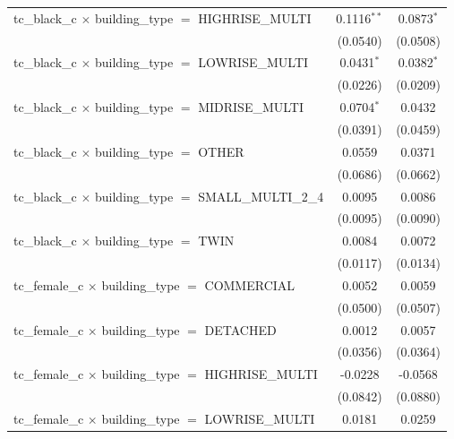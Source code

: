 \begin{tabular}{lcc}
   tc\_black\_c $\times$ building\_type $=$ HIGHRISE\_MULTI            & 0.1116$^{**}$  & 0.0873$^{*}$\\   
                                                                       & (0.0540)       & (0.0508)\\   
   tc\_black\_c $\times$ building\_type $=$ LOWRISE\_MULTI             & 0.0431$^{*}$   & 0.0382$^{*}$\\   
                                                                       & (0.0226)       & (0.0209)\\   
   tc\_black\_c $\times$ building\_type $=$ MIDRISE\_MULTI             & 0.0704$^{*}$   & 0.0432\\   
                                                                       & (0.0391)       & (0.0459)\\   
   tc\_black\_c $\times$ building\_type $=$ OTHER                      & 0.0559         & 0.0371\\   
                                                                       & (0.0686)       & (0.0662)\\   
   tc\_black\_c $\times$ building\_type $=$ SMALL\_MULTI\_2\_4         & 0.0095         & 0.0086\\   
                                                                       & (0.0095)       & (0.0090)\\   
   tc\_black\_c $\times$ building\_type $=$ TWIN                       & 0.0084         & 0.0072\\   
                                                                       & (0.0117)       & (0.0134)\\   
   tc\_female\_c $\times$ building\_type $=$ COMMERCIAL                & 0.0052         & 0.0059\\   
                                                                       & (0.0500)       & (0.0507)\\   
   tc\_female\_c $\times$ building\_type $=$ DETACHED                  & 0.0012         & 0.0057\\   
                                                                       & (0.0356)       & (0.0364)\\   
   tc\_female\_c $\times$ building\_type $=$ HIGHRISE\_MULTI           & -0.0228        & -0.0568\\   
                                                                       & (0.0842)       & (0.0880)\\   
   tc\_female\_c $\times$ building\_type $=$ LOWRISE\_MULTI            & 0.0181         & 0.0259\\   

\end{tabular}
